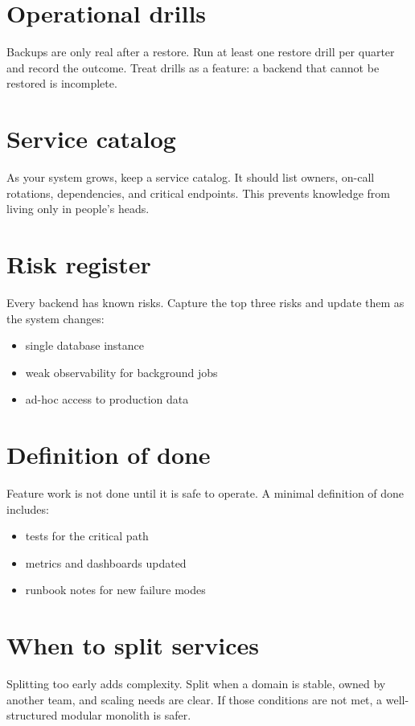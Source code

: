 \section{Operational drills}
Backups are only real after a restore.
Run at least one restore drill per quarter and record the outcome.
Treat drills as a feature: a backend that cannot be restored is incomplete.

\section{Service catalog}
As your system grows, keep a service catalog.
It should list owners, on-call rotations, dependencies, and critical endpoints.
This prevents knowledge from living only in people's heads.

\section{Risk register}
Every backend has known risks.
Capture the top three risks and update them as the system changes:
\begin{itemize}[nosep]
  \item single database instance
  \item weak observability for background jobs
  \item ad-hoc access to production data
\end{itemize}

\section{Definition of done}
Feature work is not done until it is safe to operate.
A minimal definition of done includes:
\begin{itemize}[nosep]
  \item tests for the critical path
  \item metrics and dashboards updated
  \item runbook notes for new failure modes
\end{itemize}

\section{When to split services}
Splitting too early adds complexity.
Split when a domain is stable, owned by another team, and scaling needs are clear.
If those conditions are not met, a well-structured modular monolith is safer.

